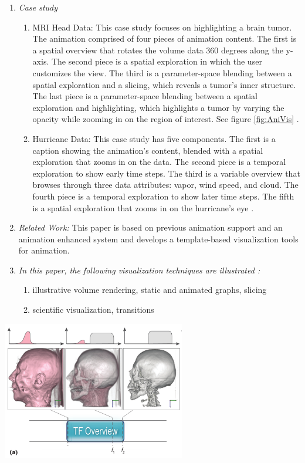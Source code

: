 \documentclass{egpubl}
\begin{document}
\begin{enumerate}
\item \textit{Case study}
\begin{enumerate}
\item MRI Head Data: This case study focuses on highlighting a brain tumor. The animation comprised of four pieces of animation content. The first is a spatial overview that rotates the volume data 360 degrees along the y-axis. The second piece is a spatial exploration in which the user customizes the view. The third is a parameter-space blending between a spatial exploration and a slicing, which reveals a tumor's inner structure.  The last piece is a parameter-space blending between a spatial exploration and highlighting, which highlights a tumor by varying the opacity while zooming in on the region of interest. See figure \ref{fig:AniVis} \cite{Akiba}.
\item Hurricane Data: This case study  has five components. The first is a caption showing the animation's content, blended with a spatial exploration that zooms in on the data. The second piece is a temporal exploration to show early time steps. The third is a variable overview that browses through three data attributes: vapor, wind speed, and cloud. The fourth piece is a temporal exploration to show later time steps. The fifth is a spatial exploration that zooms in on the hurricane's eye \cite{Akiba}.
\end{enumerate}
\item \textit{Related Work:}  This paper is based on previous animation support \cite{childs} and an animation enhanced system \cite{correa} and develops a template-based visualization tools for animation. 
\item \textit{In this paper, the following visualization techniques are illustrated :} 
\begin{enumerate}
\item illustrative volume rendering, static and animated graphs, slicing
\item scientific visualization, transitions
\end{enumerate}
\end{enumerate}


\begingroup
\centering
\includegraphics[width=8cm]{./images/AniVis}
\label{fig:AniVis}
\endgroup
\end{document}
